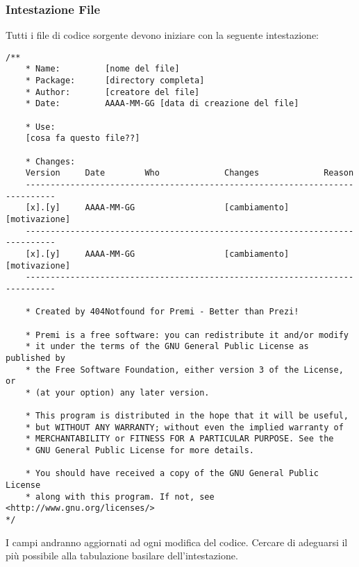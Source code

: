 \subsubsection{Intestazione File}
Tutti i file di codice sorgente devono iniziare con la seguente intestazione:
\color{blue}\begin{lstlisting}[frame=single]
/**	
	* Name: 		[nome del file]
	* Package: 		[directory completa]
	* Author: 		[creatore del file]
	* Date: 		AAAA-MM-GG [data di creazione del file]

	* Use:
	[cosa fa questo file??]
	
	* Changes:
	Version		Date		Who 			Changes				Reason
	----------------------------------------------------------------------------
	[x].[y]		AAAA-MM-GG					[cambiamento]		[motivazione]
	----------------------------------------------------------------------------
	[x].[y]		AAAA-MM-GG					[cambiamento]		[motivazione]
	----------------------------------------------------------------------------

	* Created by 404Notfound for Premi - Better than Prezi!

	* Premi is a free software: you can redistribute it and/or modify
	* it under the terms of the GNU General Public License as published by
	* the Free Software Foundation, either version 3 of the License, or
	* (at your option) any later version.

	* This program is distributed in the hope that it will be useful,
	* but WITHOUT ANY WARRANTY; without even the implied warranty of
	* MERCHANTABILITY or FITNESS FOR A PARTICULAR PURPOSE. See the
	* GNU General Public License for more details.

	* You should have received a copy of the GNU General Public License
	* along with this program. If not, see <http://www.gnu.org/licenses/>
*/

\end{lstlisting}\color{black}
I campi andranno aggiornati ad ogni modifica del codice. Cercare di adeguarsi il più possibile alla tabulazione basilare dell'intestazione.
